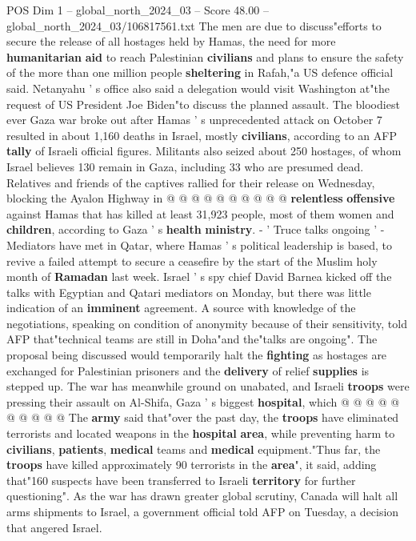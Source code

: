 \begin{textsample}{POS Dim 1 – global\_north\_2024\_03 – Score 48.00 – global\_north\_2024\_03/106817561.txt}
The men are due to discuss"efforts to secure the release of all hostages held by Hamas, the need for more \textbf{humanitarian} \textbf{aid} to reach Palestinian \textbf{civilians} and plans to ensure the safety of the more than one million people \textbf{sheltering} in Rafah,"a US defence official said.
Netanyahu ' s office also said a delegation would visit Washington at"the request of US President Joe Biden"to discuss the planned assault.
The bloodiest ever Gaza war broke out after Hamas ' s unprecedented attack on October 7 resulted in about 1,160 deaths in Israel, mostly \textbf{civilians}, according to an AFP \textbf{tally} of Israeli official figures.
Militants also seized about 250 hostages, of whom Israel believes 130 remain in Gaza, including 33 who are presumed dead.
Relatives and friends of the captives rallied for their release on Wednesday, blocking the Ayalon Highway in @ @ @ @ @ @ @ @ @ @ \textbf{relentless} \textbf{offensive} against Hamas that has killed at least 31,923 people, most of them women and \textbf{children}, according to Gaza ' s \textbf{health} \textbf{ministry}. - ' Truce talks ongoing ' - Mediators have met in Qatar, where Hamas ' s political leadership is based, to revive a failed attempt to secure a ceasefire by the start of the Muslim holy month of \textbf{Ramadan} last week.
Israel ' s spy chief David Barnea kicked off the talks with Egyptian and Qatari mediators on Monday, but there was little indication of an \textbf{imminent} agreement.
A source with knowledge of the negotiations, speaking on condition of anonymity because of their sensitivity, told AFP that"technical teams are still in Doha"and the"talks are ongoing".
The proposal being discussed would temporarily halt the \textbf{fighting} as hostages are exchanged for Palestinian prisoners and the \textbf{delivery} of relief \textbf{supplies} is stepped up.
The war has meanwhile ground on unabated, and Israeli \textbf{troops} were pressing their assault on Al-Shifa, Gaza ' s biggest \textbf{hospital}, which @ @ @ @ @ @ @ @ @ @ The \textbf{army} said that"over the past day, the \textbf{troops} have eliminated terrorists and located weapons in the \textbf{hospital} \textbf{area}, while preventing harm to \textbf{civilians}, \textbf{patients}, \textbf{medical} teams and \textbf{medical} equipment."Thus far, the \textbf{troops} have killed approximately 90 terrorists in the \textbf{area}", it said, adding that"160 suspects have been transferred to Israeli \textbf{territory} for further questioning".
As the war has drawn greater global scrutiny, Canada will halt all arms shipments to Israel, a government official told AFP on Tuesday, a decision that angered Israel.

\end{textsample}
